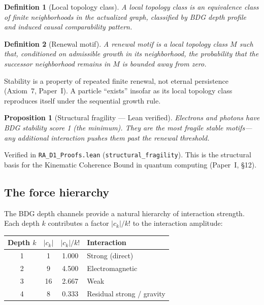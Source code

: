 \documentclass[11pt]{article}
\newtheorem{definition}{Definition}
\newtheorem{proposition}{Proposition}
\begin{document}
\begin{definition}[Local topology class]
A local topology class is an equivalence class of finite neighborhoods in the actualized graph, classified by BDG depth profile and induced causal comparability pattern.
\end{definition}

\begin{definition}[Renewal motif]
A renewal motif is a local topology class $M$ such that, conditioned on admissible growth in its neighborhood, the probability that the successor neighborhood remains in $M$ is bounded away from zero.
\end{definition}

Stability is a property of repeated finite renewal, not eternal persistence (Axiom~7, Paper~I). A particle ``exists'' insofar as its local topology class reproduces itself under the sequential growth rule.

\begin{proposition}[Structural fragility --- Lean verified]
Electrons and photons have BDG stability score 1 (the minimum). They are the most fragile stable motifs---any additional interaction pushes them past the renewal threshold.
\end{proposition}
Verified in \texttt{RA\_D1\_Proofs.lean} (\texttt{structural\_fragility}). This is the structural basis for the Kinematic Coherence Bound in quantum computing (Paper~I, \S12).

\subsection{The force hierarchy}

The BDG depth channels provide a natural hierarchy of interaction strength. Each depth $k$ contributes a factor $|c_k|/k!$ to the interaction amplitude:

\begin{center}
\begin{tabular}{cccl}
\toprule
Depth $k$ & $|c_k|$ & $|c_k|/k!$ & Interaction \\
\midrule
1 & 1 & 1.000 & Strong (direct) \\
2 & 9 & 4.500 & Electromagnetic \\
3 & 16 & 2.667 & Weak \\
4 & 8 & 0.333 & Residual strong / gravity \\
\bottomrule
\end{tabular}
\end{center}
\end{document}
